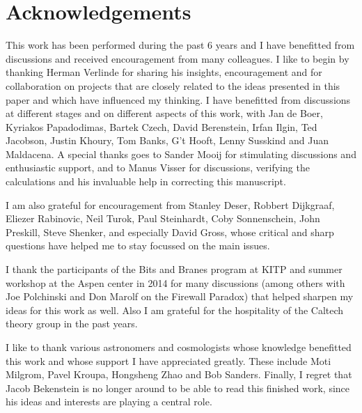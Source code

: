 \documentclass[a4paper,12pt]{article}
\begin{document}





\newpage




\section{Acknowledgements}

This work has been performed during the past 6 years and I have benefitted from 
discussions and  received encouragement from many colleagues. I like to begin by thanking Herman Verlinde for sharing his insights, encouragement and
for collaboration on projects that are closely related to the ideas presented in this paper and 
which have influenced my thinking. I have benefitted from discussions at different stages  and 
on different aspects of this work,  with Jan de Boer, Kyriakos Papadodimas, Bartek Czech, David Berenstein,  Irfan Ilgin, Ted Jacobson, Justin Khoury, Tom Banks, G't Hooft,  Lenny Susskind and 
Juan Maldacena.  A special thanks goes to Sander Mooij for stimulating discussions and enthusiastic 
support, and to Manus Visser for discussions, verifying the calculations and his 
invaluable help in correcting this manuscript. 

I am also grateful for encouragement  from Stanley Deser, Robbert Dijkgraaf, Eliezer Rabinovic, 
Neil Turok, Paul Steinhardt, Coby Sonnenschein, John Preskill, Steve Shenker,  and especially 
David Gross, whose critical and sharp questions have helped me to stay focussed on the main
 issues.  

I  thank the participants of the Bits and Branes program at KITP and summer workshop at the 
Aspen center in 2014 for many discussions (among others with Joe Polchinski and Don Marolf 
on the Firewall Paradox) that helped sharpen my ideas for this work as well.  
Also  I am grateful for the hospitality of the Caltech theory group in the past years. 

I like to thank various astronomers and cosmologists whose knowledge  benefitted  this work and 
whose support I have appreciated greatly. These include   Moti Milgrom, Pavel Kroupa, Hongsheng Zhao and  Bob Sanders. Finally, I regret that Jacob Bekenstein is no longer around to be able to read this finished work, since his ideas and interests are playing a central role.  
\end{document}
